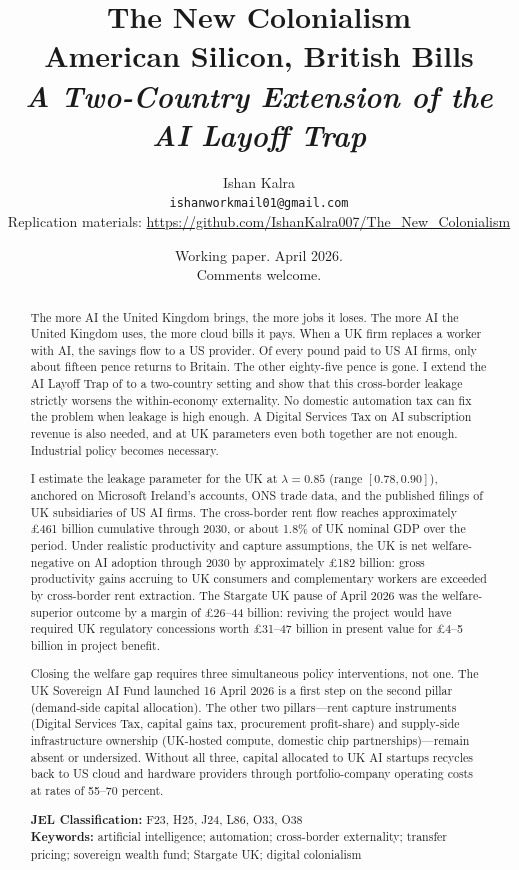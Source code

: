 \documentclass[11pt,letterpaper]{article}
\title{\textbf{The New Colonialism}\\[0.4em]
\Large American Silicon, British Bills\\[0.6em]
\normalsize\textit{A Two-Country Extension of the AI Layoff Trap}}
\author{Ishan Kalra\\[0.2em]
\small \texttt{ishanworkmail01@gmail.com}\\[0.2em]
\small Replication materials: \url{https://github.com/IshanKalra007/The_New_Colonialism}}
\date{Working paper. April 2026.\\Comments welcome.}
\theoremstyle{remark}
\begin{document}
\maketitle

\begin{abstract}
\noindent The more {AI} the United Kingdom brings, the more jobs it loses. The more {AI} the United Kingdom uses, the more cloud bills it pays. When a {UK} firm replaces a worker with {AI}, the savings flow to a {US} provider. Of every pound paid to {US} {AI} firms, only about fifteen pence returns to Britain. The other eighty-five pence is gone. I extend the {AI} Layoff Trap of \citet{hemenway_falk_tsoukalas_2026} to a two-country setting and show that this cross-border leakage strictly worsens the within-economy externality. No domestic automation tax can fix the problem when leakage is high enough. A Digital Services Tax on {AI} subscription revenue is also needed, and at {UK} parameters even both together are not enough. Industrial policy becomes necessary.

I estimate the leakage parameter for the {UK} at $\lambda = 0.85$ (range $[0.78, 0.90]$), anchored on Microsoft Ireland's accounts, {ONS} trade data, and the published filings of {UK} subsidiaries of {US} {AI} firms. The cross-border rent flow reaches approximately \pounds461 billion cumulative through 2030, or about 1.8\% of {UK} nominal {GDP} over the period. Under realistic productivity and capture assumptions, the {UK} is net welfare-negative on {AI} adoption through 2030 by approximately \pounds182 billion: gross productivity gains accruing to {UK} consumers and complementary workers are exceeded by cross-border rent extraction. The Stargate {UK} pause of April 2026 was the welfare-superior outcome by a margin of \pounds26--44 billion: reviving the project would have required {UK} regulatory concessions worth \pounds31--47 billion in present value for \pounds4--5 billion in project benefit.

Closing the welfare gap requires three simultaneous policy interventions, not one. The {UK} Sovereign {AI} Fund launched 16 April 2026 is a first step on the second pillar (demand-side capital allocation). The other two pillars---rent capture instruments (Digital Services Tax, capital gains tax, procurement profit-share) and supply-side infrastructure ownership ({UK}-hosted compute, domestic chip partnerships)---remain absent or undersized. Without all three, capital allocated to {UK} {AI} startups recycles back to {US} cloud and hardware providers through portfolio-company operating costs at rates of 55--70 percent.

\bigskip

\noindent \textbf{JEL Classification:} F23, H25, J24, L86, O33, O38\\[0.3em]
\textbf{Keywords:} artificial intelligence; automation; cross-border externality; transfer pricing; sovereign wealth fund; Stargate UK; digital colonialism
\end{abstract}
\end{document}
